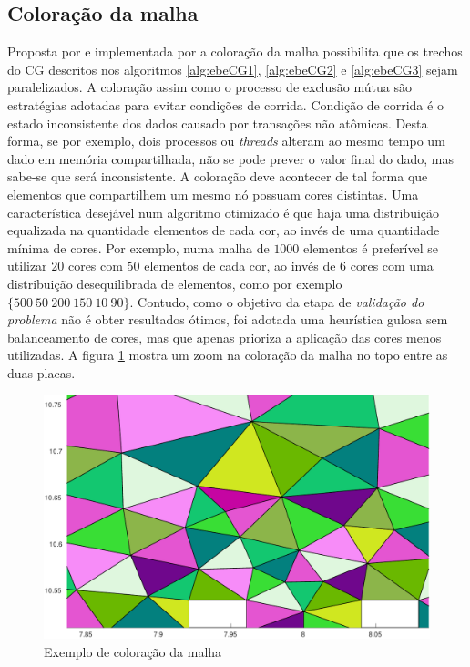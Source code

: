 \documentclass[
    12pt,               %
    openright,          %
    oneside,
    a4paper,            %
    english,            %
    french,             %
    spanish,            %
    brazil              %
    ]{abntex2}
\begin{document}
\subsection{Coloração da malha}
Proposta por  e implementada por  a coloração da malha possibilita que os trechos do CG descritos nos algoritmos \ref{alg:ebeCG1}, \ref{alg:ebeCG2} e \ref{alg:ebeCG3} sejam paralelizados. A coloração assim como o processo de exclusão mútua são estratégias adotadas para evitar condições de corrida. Condição de corrida é o estado inconsistente dos dados causado por transações não atômicas. Desta forma, se por exemplo, dois processos ou \textit{threads} alteram ao mesmo tempo um dado em memória compartilhada, não se pode prever o valor final do dado, mas sabe-se que será inconsistente. A coloração deve acontecer de tal forma que elementos que compartilhem um mesmo nó possuam cores distintas. Uma característica desejável num algoritmo otimizado é que haja uma distribuição equalizada na quantidade elementos de cada cor, ao invés de uma quantidade mínima de cores. Por exemplo, numa malha de $1000$ elementos é preferível se utilizar $20$ cores com $50$ elementos de cada cor, ao invés de $6$ cores com uma distribuição desequilibrada de elementos, como por exemplo $\{500 \ 50 \ 200 \ 150 \ 10 \ 90\}$. Contudo, como o objetivo da etapa de \textit{validação do problema} não é obter resultados ótimos, foi adotada uma heurística gulosa sem balanceamento de cores, mas que apenas prioriza a aplicação das cores menos utilizadas. A figura \ref{fig:color} mostra um zoom na coloração da malha no topo entre as duas placas.

\begin{figure}[!htb]
	\centering
	\includegraphics[scale=0.5]{figuras/color.pdf}
	\caption{Exemplo de coloração da malha}
	\label{fig:color}
\end{figure}
\end{document}
